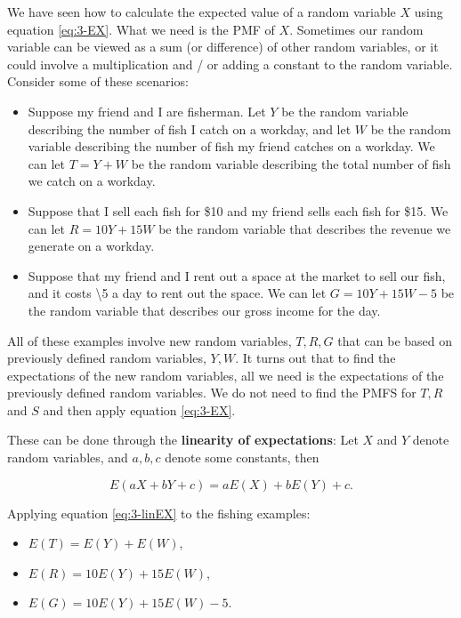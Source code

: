 \documentclass[
]{book}
\providecommand{\tightlist}{%
  \setlength{\itemsep}{0pt}\setlength{\parskip}{0pt}}
\begin{document}
We have seen how to calculate the expected value of a random variable \(X\) using equation \eqref{eq:3-EX}. What we need is the PMF of \(X\). Sometimes our random variable can be viewed as a sum (or difference) of other random variables, or it could involve a multiplication and / or adding a constant to the random variable. Consider some of these scenarios:

\begin{itemize}
\item
  Suppose my friend and I are fisherman. Let \(Y\) be the random variable describing the number of fish I catch on a workday, and let \(W\) be the random variable describing the number of fish my friend catches on a workday. We can let \(T = Y+W\) be the random variable describing the total number of fish we catch on a workday.
\item
  Suppose that I sell each fish for \$10 and my friend sells each fish for \$15. We can let \(R = 10Y + 15W\) be the random variable that describes the revenue we generate on a workday.
\item
  Suppose that my friend and I rent out a space at the market to sell our fish, and it costs \textbackslash5 a day to rent out the space. We can let \(G = 10Y + 15W - 5\) be the random variable that describes our gross income for the day.
\end{itemize}

All of these examples involve new random variables, \(T, R, G\) that can be based on previously defined random variables, \(Y, W\). It turns out that to find the expectations of the new random variables, all we need is the expectations of the previously defined random variables. We do not need to find the PMFS for \(T, R\) and \(S\) and then apply equation \eqref{eq:3-EX}.

These can be done through the \textbf{linearity of expectations}: Let \(X\) and \(Y\) denote random variables, and \(a,b,c\) denote some constants, then

\begin{equation} 
E(aX + bY +c) = aE(X) + bE(Y) + c.
\label{eq:3-linEX}
\end{equation}

Applying equation \eqref{eq:3-linEX} to the fishing examples:

\begin{itemize}
\tightlist
\item
  \(E(T) = E(Y) + E(W)\),
\item
  \(E(R) = 10E(Y) + 15E(W)\),
\item
  \(E(G) = 10E(Y) + 15E(W) - 5\).
\end{itemize}
\end{document}
